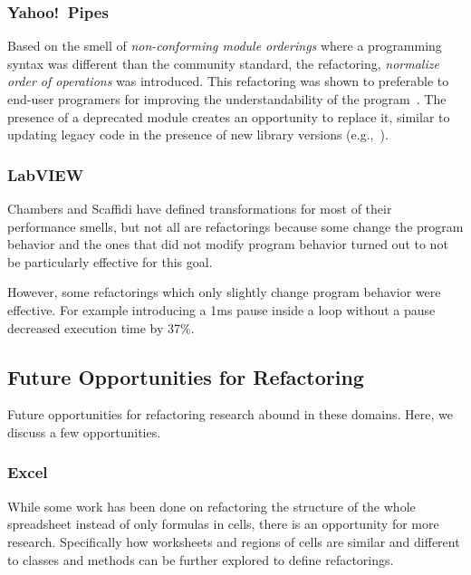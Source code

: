 \documentclass[10pt,conference,compsocconf]{IEEEtran}
\begin{document}
\subsubsection{Yahoo!\ Pipes}
\label{sec:yp:domainrefactor}
Based on the smell of \emph{non-conforming module orderings} where a programming syntax was different than the community standard, the refactoring, \emph{normalize order of operations} was introduced. This refactoring was shown to preferable to end-user programers for improving the understandability of the program~\cite{StoleeTSE2013}. 
The presence of a deprecated module creates an opportunity to 
replace it, similar to updating legacy code in the presence of new library versions (e.g.,~\cite{Tansey:2008:ARI:1449955.1449788, Balaban:2005:RSC:1103845.1094832}). 


\subsubsection{LabVIEW}

Chambers and Scaffidi \cite{chambers2015impact} have defined transformations for most of their performance smells, but not all are refactorings because some change the program behavior and the ones that did not modify program behavior turned out to not be particularly effective for this goal.

However, some refactorings which only slightly change program behavior were effective. For example introducing a 1ms pause inside a loop without a pause decreased execution time by 37\%.

\subsection{Future Opportunities for Refactoring}

Future opportunities for refactoring research abound in these domains. Here, we discuss a few opportunities. 

\subsubsection{Excel}

While some work has been done on refactoring the structure of the whole spreadsheet instead of only formulas in cells, there is an opportunity for more research. 
Specifically how worksheets and regions of cells are similar and different to classes and methods can be further explored to define refactorings.
\end{document}

